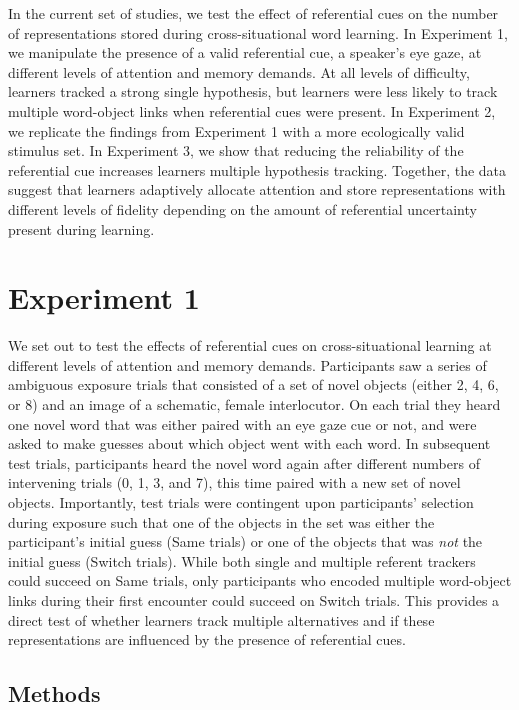 \documentclass[10pt,letterpaper]{article}
\begin{document}
In the current set of studies, we test the effect of referential cues on the number of representations stored during cross-situational word learning. In Experiment 1, we manipulate the presence of a valid referential cue, a speaker's eye gaze, at different levels of attention and memory demands. At all levels of difficulty, learners tracked a strong single hypothesis, but learners were less likely to track multiple word-object links when referential cues were present. In Experiment 2, we replicate the findings from Experiment 1 with a more ecologically valid stimulus set. In Experiment 3, we show that reducing the reliability of the referential cue increases learners multiple hypothesis tracking. Together, the data suggest that learners adaptively allocate attention and store representations with different levels of fidelity depending on the amount of referential uncertainty present during learning.	


\section{Experiment 1}

We set out to test the effects of referential cues on cross-situational learning at different levels of attention and memory demands. Participants saw a series of ambiguous exposure trials that consisted of a set of novel objects (either 2, 4, 6, or 8) and an image of a schematic, female interlocutor. On each trial they heard one novel word that was either paired with an eye gaze cue or not, and were asked to make guesses about which object went with each word. In subsequent test trials, participants heard the novel word again after different numbers of intervening trials (0, 1, 3, and 7), this time paired with a new set of novel objects. Importantly, test trials were contingent upon participants' selection during exposure such that one of the objects in the set was either the participant's initial guess (Same trials) or one of the objects that was \emph{not} the initial guess (Switch trials). While both single and multiple referent trackers could succeed on Same trials, only participants who encoded multiple word-object links during their first encounter could succeed on Switch trials. This provides a direct test of whether learners track multiple alternatives and if these representations are influenced by the presence of referential cues. 

\subsection{Methods}
\end{document}
